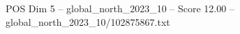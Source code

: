 \begin{textsample}{POS Dim 5 – global\_north\_2023\_10 – Score 12.00 – global\_north\_2023\_10/102875867.txt}
\end{textsample}
